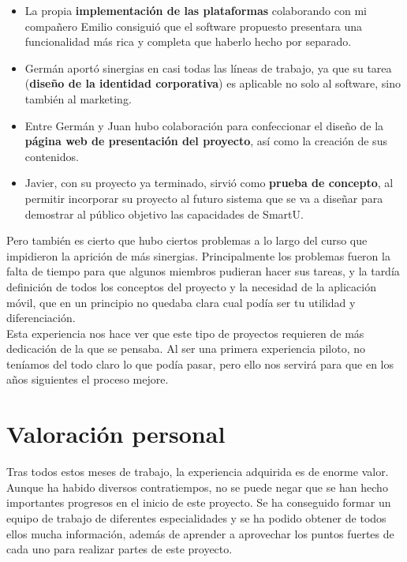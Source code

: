 \begin{itemize}
    \item La propia \textbf{implementación de las plataformas} colaborando con mi compañero Emilio consiguió que el software propuesto presentara una funcionalidad más rica y completa que haberlo hecho por separado.
    \item Germán aportó sinergias en casi todas las líneas de trabajo, ya que su tarea (\textbf{diseño de la identidad corporativa}) es aplicable no solo al software, sino también al marketing.
    \item Entre Germán y Juan hubo colaboración para confeccionar el diseño de la \textbf{página web de presentación del proyecto}, así como la creación de sus contenidos.
    \item Javier, con su proyecto ya terminado, sirvió como \textbf{prueba de concepto}, al permitir incorporar su proyecto al futuro sistema que se va a diseñar para demostrar al público objetivo las capacidades de SmartU.
\end{itemize}

Pero también es cierto que hubo ciertos problemas a lo largo del curso que impidieron la aprición de más sinergias. Principalmente los problemas fueron la falta de tiempo para que algunos miembros pudieran hacer sus tareas, y la tardía definición de todos los conceptos del proyecto y la necesidad de la aplicación móvil, que en un principio no quedaba clara cual podía ser tu utilidad y diferenciación.\\

Esta experiencia nos hace ver que este tipo de proyectos requieren de más dedicación de la que se pensaba. Al ser una primera experiencia piloto, no teníamos del todo claro lo que podía pasar, pero ello nos servirá para que en los años siguientes el proceso mejore.

\section{Valoración personal}
Tras todos estos meses de trabajo, la experiencia adquirida es de enorme valor. Aunque ha habido diversos contratiempos, no se puede negar que se han hecho importantes progresos en el inicio de este proyecto. Se ha conseguido formar un equipo de trabajo de diferentes especialidades y se ha podido obtener de todos ellos mucha información, además de aprender a aprovechar los puntos fuertes de cada uno para realizar partes de este proyecto.\\

